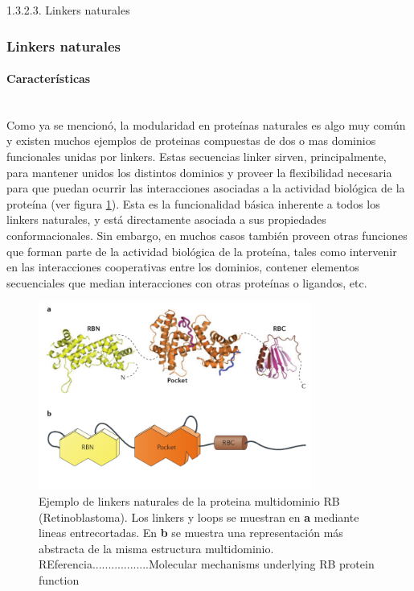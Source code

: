   1.3.2.3. Linkers naturales

\subsubsection{Linkers naturales}


\paragraph{Características} \hspace{0pt} \\
Como ya se mencionó, la modularidad en proteínas naturales es algo muy común y existen muchos ejemplos de proteinas compuestas de dos o mas dominios funcionales unidas por linkers.
Estas secuencias linker sirven, principalmente, para mantener unidos los distintos dominios y proveer la flexibilidad necesaria para que puedan ocurrir las interacciones asociadas a la actividad biológica de la proteína
(ver figura \ref{multidomainRb}). Esta es la funcionalidad básica inherente a todos los linkers naturales, y está directamente asociada a sus propiedades conformacionales. 
Sin embargo, en muchos casos también proveen otras funciones que forman parte de la actividad biológica de la proteína, tales como intervenir en las interacciones cooperativas entre los dominios, 
contener elementos secuenciales que median interacciones con otras proteínas o ligandos, etc.

\begin{figure}[ht]
\centering
\includegraphics[width=0.8\textwidth]{img/multidomainRb.png} 
\caption{Ejemplo de linkers naturales de la proteina multidominio RB (Retinoblastoma). Los linkers y loops se muestran en \textbf{a} mediante lineas entrecortadas. En \textbf{b} se muestra una representación más abstracta de la misma estructura multidominio.
REferencia..................Molecular mechanisms underlying RB protein function} 
\label{multidomainRb}
\end{figure}


